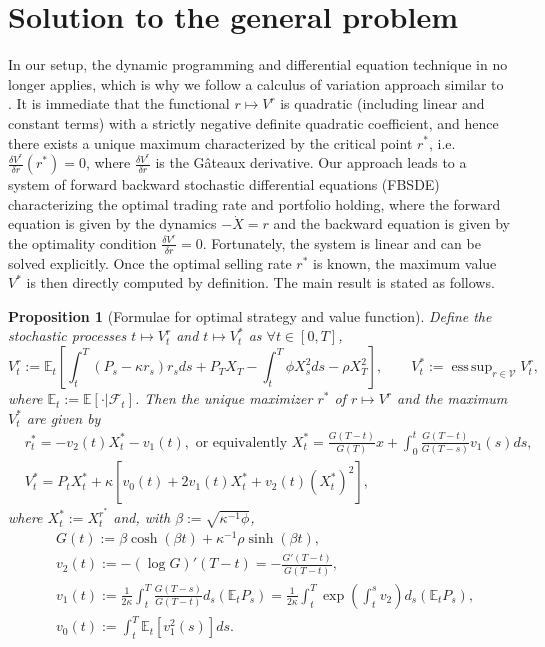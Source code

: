 \documentclass[openany,oneside]{article}
\newtheorem{prop}[thm]{Proposition}
\theoremstyle{definition}
\theoremstyle{remark}
\newcommand{\E}{\mathbb{E}} %
\newcommand{\F}{\mathcal{F}} %
\newcommand{\ts}{\textstyle}
\DeclareMathOperator{\esssup}{ess\, sup}
\newcommand{\closeEqn}{\tag*{$\diamond$}}
\begin{document}
\section{Solution to the general problem}
In our setup, the dynamic programming and differential equation technique in \cite{lehalle2017incorporating} no longer applies, which is why we follow a calculus of variation approach similar to \cite{bouchard2017equilibrium}. It is immediate that the functional $r\mapsto V^r$ is quadratic (including linear and constant terms) with a strictly negative definite quadratic coefficient, and hence there exists a unique maximum characterized by the critical point $r^\ast$, i.e. $\frac{\delta V^r}{\delta r}(r^\ast) =0$, where $\frac{\delta V^r}{\delta r}$ is the G\^ateaux derivative. Our approach leads to a system of forward backward stochastic differential equations (FBSDE) characterizing the optimal trading rate and portfolio holding, where the forward equation is given by the dynamics $-\dot{X}=r$ and the backward equation is given by the optimality condition $\frac{\delta V^r}{\delta r}=0$. Fortunately, the system is linear and can be solved explicitly. Once the optimal selling rate $r^\ast$ is known, the maximum value $V^\ast$ is then directly computed by definition. The main result is stated as follows.

\begin{prop}[Formulae for optimal strategy and value function]\label{main}
Define the stochastic processes $t\mapsto V^r_t$ and $t\mapsto V^\ast_t$ as $\forall t\in[0,T]$,
\[
\ts V^r_t := \E_t \left[\int_t^T (P_s-\kappa r_s)r_s ds + P_T X_T -\int_t^T \phi X_s^2 ds - \rho X_T^2 \right], \qquad V^\ast_t := \esssup_{r\in\mathcal{V}} V^r_t,
\]
where $\E_t:=\E[\cdot \vert \F_t]$. Then the unique maximizer $r^\ast$ of $r\mapsto V^r$ and the maximum $V^\ast_t$ are given by
\begin{align*}
&\ts r^\ast_t = -v_2(t) X_t^{\ast} - v_1(t), \textrm{ or equivalently } X^{\ast}_t = \frac{G(T-t)}{G(T)}x + \int_0^t \frac{G(T-t)}{G(T-s)} v_1(s) ds, \\
&\ts V^\ast_t = P_t X_t^{\ast} + \kappa\left[v_0(t) + 2 v_1(t) X_t^{\ast} + v_2(t) (X_t^{\ast})^2\right],
\end{align*}
where $X_t^{\ast} := X_t^{r^\ast}$ and, with $\beta:=\sqrt{\kappa^{-1}\phi}$,
\begin{align*}
&\ts G(t)  := \beta\cosh(\beta t)+\kappa^{-1}\rho\sinh(\beta t),\\
&\ts v_2(t):= -(\log G)'(T-t) = -\frac{G'(T-t)}{G(T-t)},\\
&\ts v_1(t):= \frac{1}{2\kappa}\int_t^T \frac{G(T-s)}{G(T-t)} d_s(\E_t P_s) = \frac{1}{2\kappa}\int_t^T \exp\left(\int_t^s v_2\right) d_s(\E_t P_s), \\
&\ts v_0(t):= \int_t^T \E_t[v_1^2(s)] ds.\closeEqn
\end{align*}
\end{prop}
\end{document}
